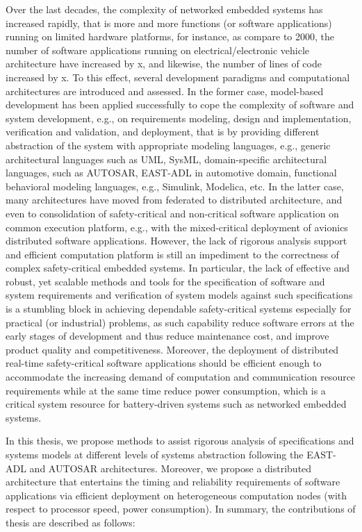 Over the last decades, the complexity of networked embedded systems has increased rapidly, that is more and more functions (or software applications) running on limited hardware platforms, for instance, as compare to 2000, the number of software applications running on electrical/electronic vehicle architecture have increased by x, and likewise, the number of lines of code increased by x. To this effect, several development paradigms and computational architectures are introduced and assessed. In the former case, model-based development has been applied successfully to cope the complexity of software and system development, e.g., on requirements modeling, design and implementation, verification and validation, and deployment, that is by providing different abstraction of the system with appropriate modeling languages, e.g., generic architectural languages such as UML, SysML, domain-specific architectural languages, such as AUTOSAR, EAST-ADL in automotive domain, functional behavioral modeling languages, e.g., Simulink, Modelica, etc. In the latter case, many architectures have moved from federated to distributed architecture, and even to consolidation of safety-critical and non-critical software application on common execution platform, e.g., with the mixed-critical deployment of avionics distributed software applications. However, the lack of rigorous analysis support and efficient computation platform is still an impediment to the correctness of complex safety-critical embedded systems. In particular, the lack of effective and robust, yet scalable methods and tools for the specification of software and system requirements and verification of system models against such specifications is a stumbling block in achieving dependable safety-critical systems especially for practical (or industrial) problems, as such capability reduce software errors at the early stages of development and thus reduce maintenance cost, and improve product quality and competitiveness. Moreover, the deployment of distributed real-time safety-critical software applications should be efficient enough to accommodate the increasing demand of computation and communication resource requirements while at the same time reduce power consumption, which is a critical system resource for battery-driven systems such as  networked embedded systems.

In this thesis, we propose methods to assist rigorous analysis of specifications and systems models at different levels of systems abstraction following the EAST-ADL and AUTOSAR architectures. Moreover, we propose a distributed architecture that entertains the timing and reliability requirements of software applications via efficient deployment on heterogeneous computation nodes (with respect to  processor speed, power consumption). In summary, the contributions of thesis are described as follows:

